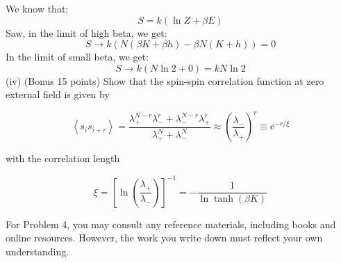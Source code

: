 \documentclass[12pt]{article}
\begin{document}
We know that:
\begin{equation}
S=k(\ln Z+\beta E)
\end{equation}
Saw, in the limit of high beta, we get:
\begin{equation}
S \rightarrow k(N \left(\beta K + \beta h\right) - \beta N \left(K+h\right)) = 0
\end{equation}
In the limit of small beta, we get:
\begin{equation}
S \rightarrow k(N \ln 2 + 0) = kN \ln 2
\end{equation}
(iv) (Bonus 15 points) Show that the spin-spin correlation function at zero external field is given by


\begin{equation*}
\left\langle s_{i} s_{i+r}\right\rangle=\frac{\lambda_{+}^{N-r} \lambda_{-}^{r}+\lambda_{-}^{N-r} \lambda_{+}^{r}}{\lambda_{+}^{N}+\lambda_{-}^{N}} \approx\left(\frac{\lambda_{-}}{\lambda_{+}}\right)^{r} \equiv \mathrm{e}^{-r / \xi} \tag{7}
\end{equation*}


with the correlation length


\begin{equation*}
\xi=\left[\ln \left(\frac{\lambda_{+}}{\lambda_{-}}\right)\right]^{-1}=-\frac{1}{\ln \tanh (\beta K)} \tag{8}
\end{equation*}


For Problem 4, you may consult any reference materials, including books and online resources. However, the work you write down must reflect your own understanding.
\end{document}
